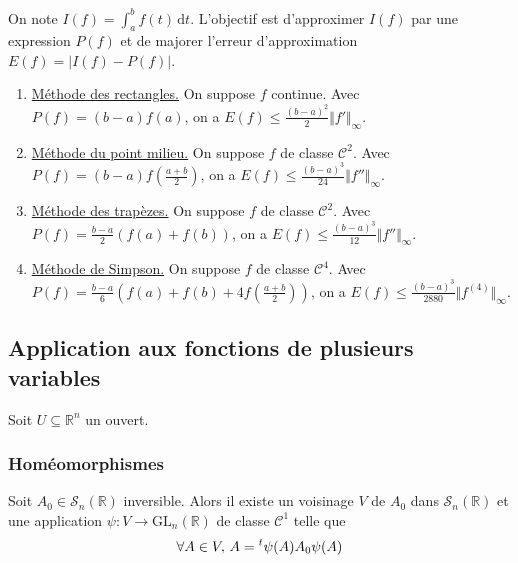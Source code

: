 
  \begin{application}
    On note $I(f) = \int_a^b f(t) \, \mathrm{d}t$. L'objectif est d'approximer $I(f)$ par une expression $P(f)$ et de majorer l'erreur d'approximation $E(f) = \vert I(f) - P(f) \vert$.
    \begin{enumerate}[label={\bfseries(\roman*)}]
      \item \uline{Méthode des rectangles.} On suppose $f$ continue. Avec $P(f) = (b-a)f(a)$, on a $E(f) \leq \frac{(b-a)^2}{2} \Vert f' \Vert_\infty$.
      \item \uline{Méthode du point milieu.} On suppose $f$ de classe $\mathcal{C}^2$. Avec $P(f) = (b-a)f \left( \frac{a+b}{2} \right)$, on a $E(f) \leq \frac{(b-a)^3}{24} \Vert f'' \Vert_\infty$.
      \item \uline{Méthode des trapèzes.} On suppose $f$ de classe $\mathcal{C}^2$. Avec $P(f) = \frac{b-a}{2} (f(a) + f(b))$, on a $E(f) \leq \frac{(b-a)^3}{12} \Vert f'' \Vert_\infty$.
      \item \uline{Méthode de Simpson.} On suppose $f$ de classe $\mathcal{C}^4$. Avec $P(f) = \frac{b-a}{6} \left(f(a) + f(b) + 4f \left( \frac{a+b}{2} \right)\right)$, on a $E(f) \leq \frac{(b-a)^3}{2880} \Vert f^{(4)} \Vert_\infty$.
    \end{enumerate}
  \end{application}

  \subsection{Application aux fonctions de plusieurs variables}

  Soit $U \subseteq \mathbb{R}^n$ un ouvert.

  \subsubsection{Homéomorphismes}


  \begin{lemma}
    Soit $A_0 \in \mathcal{S}_n(\mathbb{R})$ inversible. Alors il existe un voisinage $V$ de $A_0$ dans $\mathcal{S}_n(\mathbb{R})$ et une application $\psi : V \rightarrow \mathrm{GL}_n(\mathbb{R})$ de classe $\mathcal{C}^1$ telle que
    \[ \forall A \in V, \, A = \mathstrut ^t \psi(A) A_0 \psi(A) \]
  \end{lemma}

